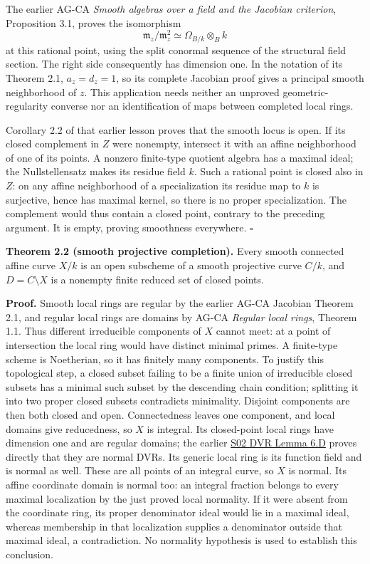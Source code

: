 \documentclass[11pt,a4paper,openany]{report}
\newcounter{none}
\begin{document}
The earlier AG-CA \emph{Smooth algebras over a field and the Jacobian criterion}, Proposition 3.1, proves the isomorphism \[
 \mathfrak m_z/\mathfrak m_z^2
 \simeq \Omega_{B/k}\otimes_B k
\] at this rational point, using the split conormal sequence of the structural field section. The right side consequently has dimension one. In the notation of its Theorem 2.1, \(a_z=d_z=1\), so its complete Jacobian proof gives a principal smooth neighborhood of \(z\). This application needs neither an unproved geometric-regularity converse nor an identification of maps between completed local rings.

Corollary 2.2 of that earlier lesson proves that the smooth locus is open. If its closed complement in \(Z\) were nonempty, intersect it with an affine neighborhood of one of its points. A nonzero finite-type quotient algebra has a maximal ideal; the Nullstellensatz makes its residue field \(k\). Such a rational point is closed also in \(Z\): on any affine neighborhood of a specialization its residue map to \(k\) is surjective, hence has maximal kernel, so there is no proper specialization. The complement would thus contain a closed point, contrary to the preceding argument. It is empty, proving smoothness everywhere. \(\square\)

\textbf{Theorem 2.2 (smooth projective completion).} Every smooth connected affine curve \(X/k\) is an open subscheme of a smooth projective curve \(C/k\), and \(D=C\setminus X\) is a nonempty finite reduced set of closed points.

\textbf{Proof.} Smooth local rings are regular by the earlier AG-CA Jacobian Theorem 2.1, and regular local rings are domains by AG-CA \emph{Regular local rings}, Theorem 1.1. Thus different irreducible components of \(X\) cannot meet: at a point of intersection the local ring would have distinct minimal primes. A finite-type scheme is Noetherian, so it has finitely many components. To justify this topological step, a closed subset failing to be a finite union of irreducible closed subsets has a minimal such subset by the descending chain condition; splitting it into two proper closed subsets contradicts minimality. Disjoint components are then both closed and open. Connectedness leaves one component, and local domains give reducedness, so \(X\) is integral. Its closed-point local rings have dimension one and are regular domains; the earlier \href{https://github.com/KokunoYumeto/open-math-courses/blob/main/docs/courses/AG-RG/AG-RG-S02.md}{S02 DVR Lemma 6.D} proves directly that they are normal DVRs. Its generic local ring is its function field and is normal as well. These are all points of an integral curve, so \(X\) is normal. Its affine coordinate domain is normal too: an integral fraction belongs to every maximal localization by the just proved local normality. If it were absent from the coordinate ring, its proper denominator ideal would lie in a maximal ideal, whereas membership in that localization supplies a denominator outside that maximal ideal, a contradiction. No normality hypothesis is used to establish this conclusion.
\end{document}
